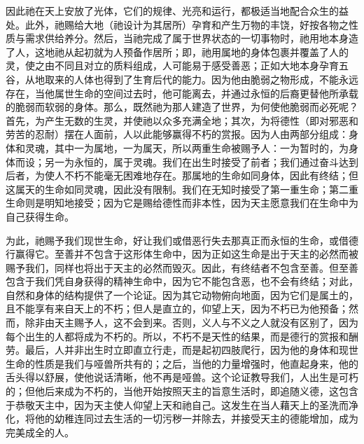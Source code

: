 因此祂在天上安放了光体，它们的规律、光亮和运行，都极适当地配合众生的益处。此外，祂赐给大地（祂设计为其居所）孕育和产生万物的丰饶，好按各物之性质与需求供给养分。然后，当祂完成了属于世界状态的一切事物时，祂用地本身造了人，这地祂从起初就为人预备作居所；即，祂用属地的身体包裹并覆盖了人的灵，使之由不同且对立的质料组成，人可能易于感受善恶；正如大地本身孕育五谷，从地取来的人体也得到了生育后代的能力。因为他由脆弱之物形成，不能永远存在，当他属世生命的空间过去时，他可能离去，并通过永恒的后裔更替他所承载的脆弱而软弱的身体。那么，既然祂为那人建造了世界，为何使他脆弱而必死呢？首先，为产生无数的生灵，并使祂以众多充满全地；其次，为将德性（即对邪恶和劳苦的忍耐）摆在人面前，人以此能够赢得不朽的赏报。因为人由两部分组成：身体和灵魂，其中一为属地，一为属天，所以两重生命被赐予人：一为暂时的，为身体而设；另一为永恒的，属于灵魂。我们在出生时接受了前者；我们通过奋斗达到后者，为使人不朽不能毫无困难地存在。那属地的生命如同身体，因此有终结；但这属天的生命如同灵魂，因此没有限制。我们在无知时接受了第一重生命；第二重生命则是明知地接受；因为它是赐给德性而非本性，因为天主愿意我们在生命中为自己获得生命。\par

为此，祂赐予我们现世生命，好让我们或借恶行失去那真正而永恒的生命，或借德行赢得它。至善并不包含于这形体生命中，因为正如这生命是出于天主的必然而被赐予我们，同样也将出于天主的必然而毁灭。因此，有终结者不包含至善。但至善包含于我们凭自身获得的精神生命中，因为它不能包含恶，也不会有终结；对此，自然和身体的结构提供了一个论证。因为其它动物俯向地面，因为它们是属土的，且不能享有来自天上的不朽；但人是直立的，仰望上天，因为不朽已为他预备；然而，除非由天主赐予人，这不会到来。否则，义人与不义之人就没有区别了，因为每个出生的人都将成为不朽的。所以，不朽不是天性的结果，而是德行的赏报和酬劳。最后，人并非出生时立即直立行走，而是起初四肢爬行，因为他的身体和现世生命的性质是我们与哑兽所共有的；之后，当他的力量增强时，他直起身来，他的舌头得以舒展，使他说话清晰，他不再是哑兽。这个论证教导我们，人出生是可朽的；但他后来成为不朽的，当他开始按照天主的旨意生活时，即追随义德，这包含于恭敬天主中，因为天主使人仰望上天和祂自己。这发生在当人藉天上的圣洗而净化，将他的幼稚连同过去生活的一切污秽一并除去，并接受天主的德能增加，成为完美成全的人。\par

